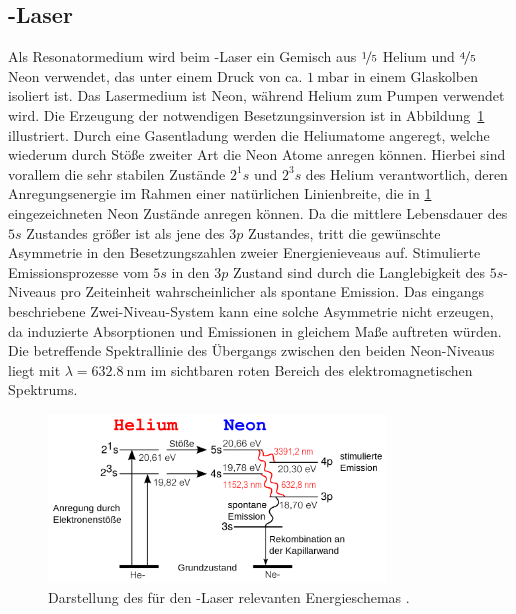 \subsection{-Laser }
Als Resonatormedium wird beim -Laser ein Gemisch aus $\nicefrac{1}{5}$ Helium und
$\nicefrac{4}{5}$ Neon verwendet, das unter einem Druck von
ca. $\SI{1}{\milli\bar}$ in einem Glaskolben isoliert ist. Das Lasermedium ist Neon, während Helium zum Pumpen verwendet wird.
Die Erzeugung der notwendigen Besetzungsinversion ist in Abbildung~\ref{fig:energieschema} 
illustriert. Durch eine Gasentladung werden
die Heliumatome angeregt, welche wiederum durch Stöße zweiter Art die Neon Atome anregen können. Hierbei sind vorallem die sehr stabilen Zustände
$2^1s$ und $2^3s$ des Helium verantwortlich, deren Anregungsenergie im Rahmen einer natürlichen Linienbreite, die in \ref{fig:energieschema}
eingezeichneten Neon Zustände anregen können. Da die mittlere Lebensdauer des $5s$ Zustandes größer ist als jene des $3p$ Zustandes, tritt die gewünschte
Asymmetrie in den Besetzungszahlen zweier Energienieveaus auf. Stimulierte Emissionsprozesse vom $5s$ in den $3p$ Zustand sind durch die Langlebigkeit
des $5s$-Niveaus pro Zeiteinheit wahrscheinlicher als spontane Emission. Das eingangs beschriebene Zwei-Niveau-System kann eine solche
Asymmetrie nicht erzeugen, da induzierte Absorptionen und Emissionen in gleichem Maße auftreten würden.
Die betreffende Spektrallinie des Übergangs zwischen den beiden Neon-Niveaus liegt mit $\lambda = \SI{632.8}{\nano\meter}$ im sichtbaren
roten Bereich des elektromagnetischen Spektrums.
\begin{figure}
	\centering
	\includegraphics[width = 0.8\textwidth]{pictures/energieschema.png}
	\caption{Darstellung des für den -Laser relevanten Energieschemas \cite{wiki}.}
        \label{fig:energieschema}
\end{figure}
